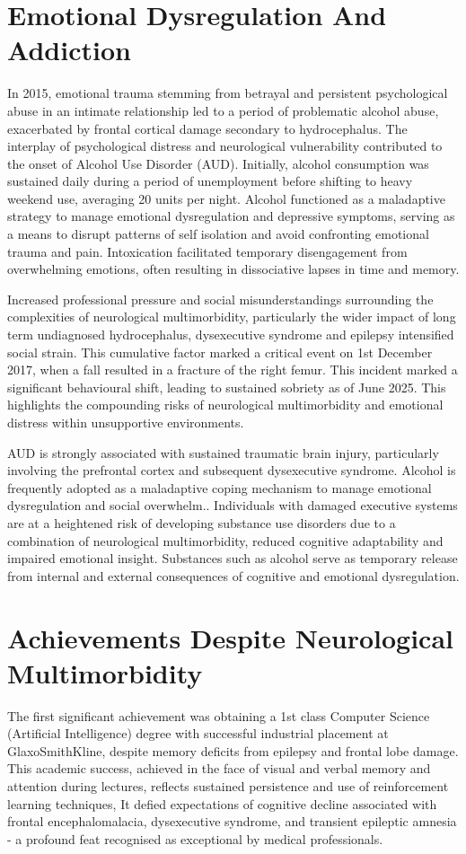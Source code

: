 \documentclass{article}
\begin{document}
\section*{Emotional Dysregulation And Addiction}
In 2015, emotional trauma stemming from betrayal and persistent psychological abuse in an intimate relationship led to a period of problematic alcohol abuse, exacerbated by frontal cortical damage secondary to hydrocephalus. The interplay of psychological distress and neurological vulnerability contributed to the onset of Alcohol Use Disorder (AUD).\cite{sinha2008,goldstein2011} Initially, alcohol consumption was sustained daily during a period of unemployment before shifting to heavy weekend use, averaging 20 units per night. Alcohol functioned as a maladaptive strategy to manage emotional dysregulation and depressive symptoms, serving as a means to disrupt patterns of self isolation and avoid confronting emotional trauma and pain. Intoxication facilitated temporary disengagement from overwhelming emotions, often resulting in dissociative lapses in time and memory.\cite{lanius2012,khoury2010}

Increased professional pressure and social misunderstandings surrounding the complexities of neurological multimorbidity, particularly the wider impact of long term undiagnosed hydrocephalus, dysexecutive syndrome and epilepsy intensified social strain. This cumulative factor marked a critical event on 1st December 2017, when a fall resulted in a fracture of the right femur. This incident marked a significant behavioural shift, leading to sustained sobriety as of June 2025. This highlights the compounding risks of neurological multimorbidity and emotional distress within unsupportive environments.

AUD is strongly associated with sustained traumatic brain injury, particularly involving the prefrontal cortex and subsequent dysexecutive syndrome. Alcohol is frequently adopted as a maladaptive coping mechanism to manage emotional dysregulation and social overwhelm.\cite{corrigan2000,corrigan2015,perry2022}. Individuals with damaged executive systems are at a heightened risk of developing substance use disorders due to a combination of neurological multimorbidity, reduced cognitive adaptability and impaired emotional insight. Substances such as alcohol serve as temporary release from internal and external consequences of cognitive and emotional dysregulation.

\section*{Achievements Despite Neurological Multimorbidity}
The first significant achievement was obtaining a 1st class Computer Science (Artificial Intelligence) degree with successful industrial placement at GlaxoSmithKline, despite memory deficits from epilepsy and frontal lobe damage. This academic success, achieved in the face of visual and verbal memory and attention during lectures, reflects sustained persistence and use of reinforcement learning techniques, It defied expectations of cognitive decline associated with frontal encephalomalacia, dysexecutive syndrome, and transient epileptic amnesia - a profound feat recognised as exceptional by medical professionals.
\end{document}
